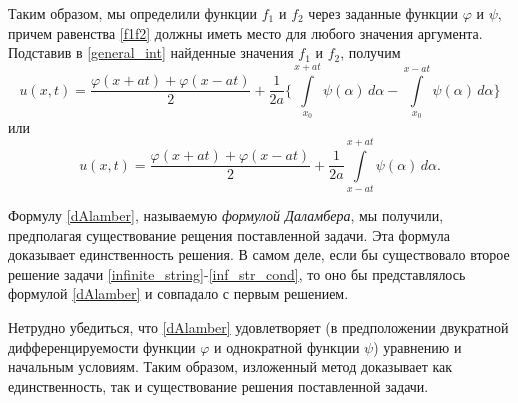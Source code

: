 Таким образом, мы определили функции $f_1$ и $f_2$ через заданные функции $\varphi$ и $\psi$, причем равенства  \eqref{f1f2} должны иметь место для любого значения аргумента. Подставив в \eqref{general_int} найденные значения $f_1$ и $f_2$, получим
\begin{equation}
	u(x, t) = \frac{\varphi(x + a t) + \varphi(x - a t)}{2} + \frac{1}{2a} \Bigg\{\int \limits_{x_0}^{x  + a t}\psi(\alpha) \, d\alpha - \int \limits_{x_0}^{x - at} \psi(\alpha) \, d\alpha \Bigg\}
\end{equation}
или 
\begin{equation} \label{dAlamber}
	u(x, t) = \frac{\varphi(x + a t) + \varphi(x - a t)}{2} + \frac{1}{2a} \int \limits_{x - a t}^{x + a t} \psi(\alpha) \, d\alpha.
\end{equation}

Формулу \eqref{dAlamber}, называемую \textit{формулой Даламбера}, мы получили, предполагая существование рещения поставленной задачи. Эта формула доказывает единственность решения. В самом деле, если бы существовало второе решение задачи \eqref{infinite_string}-\eqref{inf_str_cond}, то оно бы представлялось формулой \eqref{dAlamber} и совпадало с первым решением. 

Нетрудно убедиться, что \eqref{dAlamber} удовлетворяет (в предположении двукратной дифференцируемости функции $\varphi$ и однократной функции $\psi$) уравнению и начальным условиям. Таким образом, изложенный метод доказывает как единственность, так и существование решения поставленной задачи.